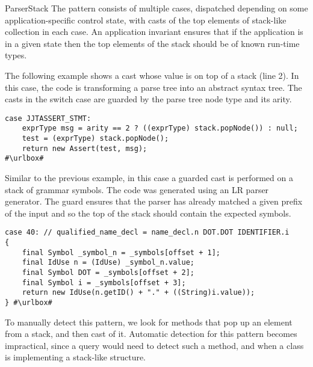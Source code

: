 \begin{pattern}{ParserStack}
The \thisp{} pattern consists of multiple cases,
dispatched depending on some application-specific control state,
with casts of the top elements of stack-like collection in each case.
An application invariant ensures that if the application is in a given 
state then the top elements of the stack should be of known run-time types.

\instances{}
The following example
shows a cast whose value is on top of a stack (line 2).
In this case,
the code is transforming a parse tree into an abstract syntax tree.
The casts in the switch case are guarded by the parse tree node type and
its arity. 

\def\urlvar{http://bit.ly/fabioz_Pydev_2HF6nrF}
\begin{verbatim}
case JJTASSERT_STMT:
    exprType msg = arity == 2 ? ((exprType) stack.popNode()) : null;
    test = (exprType) stack.popNode();
    return new Assert(test, msg);
#\urlbox#
\end{verbatim}

Similar to the previous example,
in this case a guarded cast is performed on a stack of grammar symbols.
The code was generated using an LR parser generator.
The guard ensures that the parser has already matched a given prefix of the
input and so the top of the stack should contain the expected symbols.

\def\urlvar{http://bit.ly/Sable_soot_2MZLZ3m}
\begin{verbatim}
case 40: // qualified_name_decl = name_decl.n DOT.DOT IDENTIFIER.i
{
    final Symbol _symbol_n = _symbols[offset + 1];
    final IdUse n = (IdUse) _symbol_n.value;
    final Symbol DOT = _symbols[offset + 2];
    final Symbol i = _symbols[offset + 3];
    return new IdUse(n.getID() + "." + ((String)i.value));
} #\urlbox#
\end{verbatim}


\detection{}
To manually detect this pattern,
we look for methods that pop up an element from a stack,
and then cast of it.
Automatic detection for this pattern becomes impractical,
since a query would need to detect such a method,
and when a class is implementing a stack-like structure.



\end{pattern}
